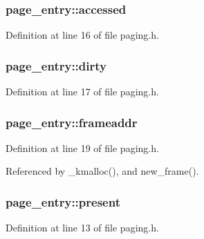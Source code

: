 \subsubsection[{\texorpdfstring{accessed}{accessed}}]{ page\+\_\+entry\+::accessed}\hypertarget{structpage__entry_a8b4097e0cee08d028182b11bd1f73f92}{}\label{structpage__entry_a8b4097e0cee08d028182b11bd1f73f92}


Definition at line 16 of file paging.\+h.

\subsubsection[{\texorpdfstring{dirty}{dirty}}]{ page\+\_\+entry\+::dirty}\hypertarget{structpage__entry_ab3b5e22c6146f227a26bdec64e63f4b0}{}\label{structpage__entry_ab3b5e22c6146f227a26bdec64e63f4b0}


Definition at line 17 of file paging.\+h.

\subsubsection[{\texorpdfstring{frameaddr}{frameaddr}}]{ page\+\_\+entry\+::frameaddr}\hypertarget{structpage__entry_a68a6dc54a7ab6f7fb1a068476190bf67}{}\label{structpage__entry_a68a6dc54a7ab6f7fb1a068476190bf67}


Definition at line 19 of file paging.\+h.



Referenced by \+\_\+kmalloc(), and new\+\_\+frame().

\subsubsection[{\texorpdfstring{present}{present}}]{ page\+\_\+entry\+::present}\hypertarget{structpage__entry_a34148a94af9bfabbb8c4f00f9865dfee}{}\label{structpage__entry_a34148a94af9bfabbb8c4f00f9865dfee}


Definition at line 13 of file paging.\+h.



